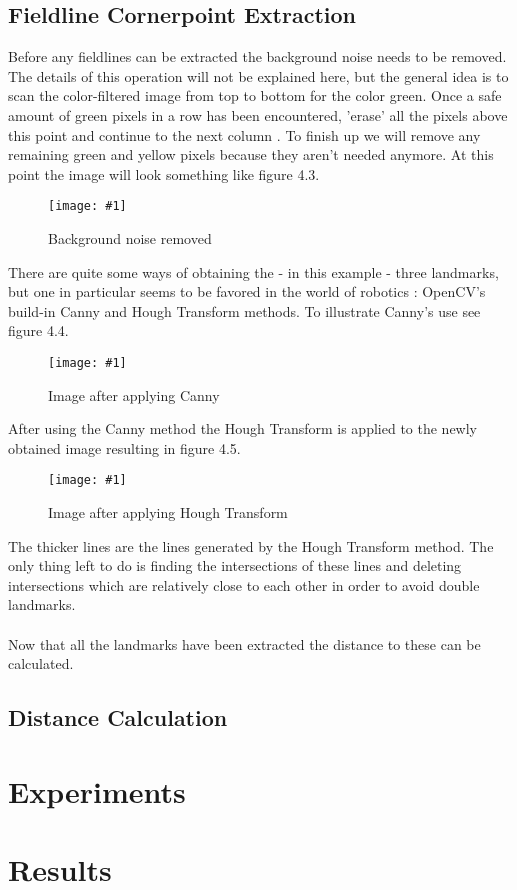 \documentclass{ba-kecs}
\numberwithin{figure}{section}
\numberwithin{equation}{section}
\newcommand{\dkepic}[2]{ %
	\begin{figure}[H] %
	\texttt{[image: \#1]}
	\caption{#2}
	\label{#1}
	\end{figure}
}
\begin{document}
\subsection{Fieldline Cornerpoint Extraction}
Before any fieldlines can be extracted the background noise needs to be removed. The details of this operation will not be explained here, but the general idea is to scan the color-filtered image from top to bottom for the color green. Once a safe amount of green pixels in a row has been encountered, 'erase' all the pixels above this point and continue to the next column \cite{ref1}. To finish up we will remove any remaining green and yellow pixels because they aren't needed anymore. At this point the image will look something like figure 4.3.\\
\dkepic{figure_IP3}{Background noise removed}
There are quite some ways of obtaining the - in this example - three landmarks, but one in particular seems to be favored in the world of robotics \cite{ref2}\cite{ref3}: OpenCV's build-in Canny and Hough Transform methods. To illustrate Canny's use see figure 4.4.\\
\dkepic{figure_IP4}{Image after applying Canny}
After using the Canny method the Hough Transform is applied to the newly obtained image resulting in figure 4.5.\\
\dkepic{figure_IP5}{Image after applying Hough Transform}
The thicker lines are the lines generated by the Hough Transform method. The only thing left to do is finding the intersections of these lines and deleting intersections which are relatively close to each other in order to avoid double landmarks.\\ \\
Now that all the landmarks have been extracted the distance to these can be calculated.


\subsection{Distance Calculation}


\section{Experiments}


\section{Results}
\end{document}
